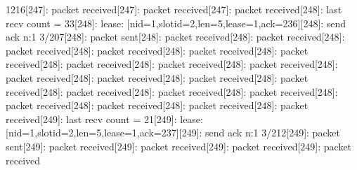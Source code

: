\documentclass[parskip]{cs4rep}
\begin{document}
1216[247]: packet received[247]: packet received[247]: packet received[248]: last recv count = 33[248]: lease: [nid=1,slotid=2,len=5,lease=1,ack=236][248]: send ack n:1 3/207[248]: packet sent[248]: packet received[248]: packet received[248]: packet received[248]: packet received[248]: packet received[248]: packet received[248]: packet received[248]: packet received[248]: packet received[248]: packet received[248]: packet received[248]: packet received[248]: packet received[248]: packet received[248]: packet received[248]: packet received[248]: packet received[248]: packet received[248]: packet received[248]: packet received[249]: last recv count = 21[249]: lease: [nid=1,slotid=2,len=5,lease=1,ack=237][249]: send ack n:1 3/212[249]: packet sent[249]: packet received[249]: packet received[249]: packet received[249]: packet received\newline
\end{document}
